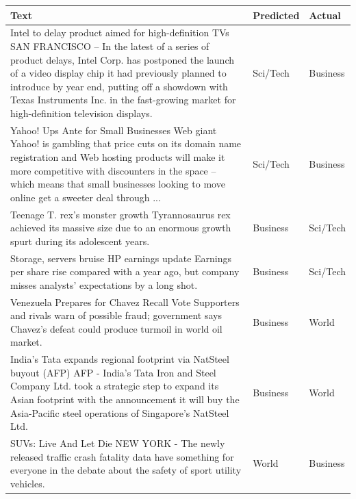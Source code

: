 \documentclass[12pt,a4paper,english]{article}
\begin{document}
\begin{longtable}{| m{25em} | m{5em} | m{5em} |}
        \hline
        \textbf{Text} & \textbf{Predicted} & \textbf{Actual} \\ \hline
         Intel to delay product aimed for high-definition TVs SAN FRANCISCO -- In the latest of a series of product delays, Intel Corp. has postponed the launch of a video display chip it had previously planned to introduce by year end, putting off a showdown with Texas Instruments Inc. in the fast-growing market for high-definition television displays. & Sci/Tech & Business \\ \hline
         
        Yahoo! Ups Ante for Small Businesses Web giant Yahoo! is gambling that price cuts on its domain name registration and Web hosting products will make it more competitive with discounters in the space -- which means that small businesses looking to move online get a sweeter deal through ... & Sci/Tech & Business \\ \hline
        
        Teenage T. rex's monster growth Tyrannosaurus rex achieved its massive size due to an enormous growth spurt during its adolescent years. & Business & Sci/Tech \\ \hline
        
        Storage, servers bruise HP earnings update Earnings per share rise compared with a year ago, but company misses analysts' expectations by a long shot. & Business & Sci/Tech \\ \hline
        
        Venezuela Prepares for Chavez Recall Vote Supporters and rivals warn of possible fraud; government says Chavez's defeat could produce turmoil in world oil market. & Business & World \\ \hline
        
        India's Tata expands regional footprint via NatSteel buyout (AFP) AFP - India's Tata Iron and Steel Company Ltd. took a strategic step to expand its Asian footprint with the announcement it will buy the Asia-Pacific steel operations of Singapore's NatSteel Ltd. & Business & World \\ \hline
        
        SUVs: Live And Let Die NEW YORK - The newly released traffic crash fatality data have something for everyone in the debate about the safety of sport utility vehicles. & World & Business \\ \hline
        

\end{longtable}
\end{document}
